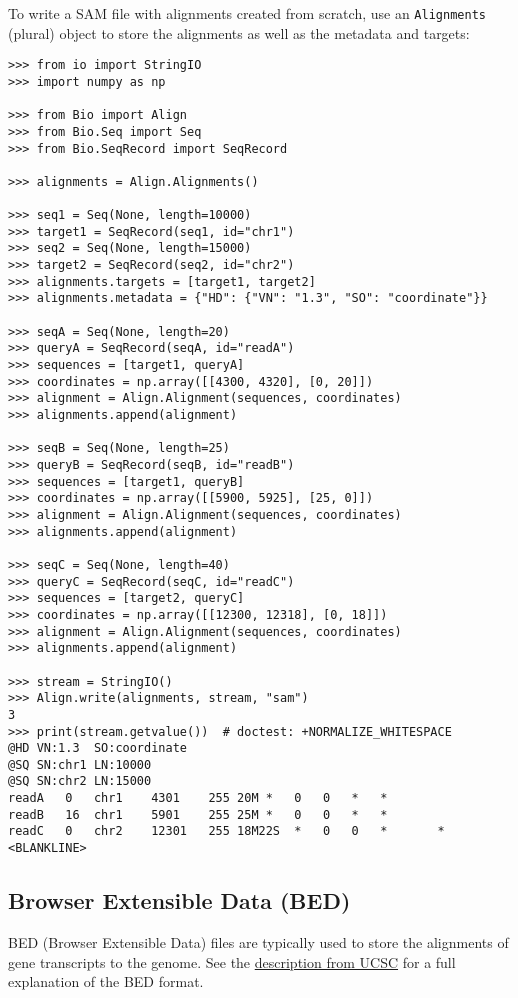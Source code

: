 To write a SAM file with alignments created from scratch, use an \verb|Alignments| (plural) object to store the alignments as well as the metadata and targets:
\begin{verbatim}
>>> from io import StringIO
>>> import numpy as np

>>> from Bio import Align
>>> from Bio.Seq import Seq
>>> from Bio.SeqRecord import SeqRecord

>>> alignments = Align.Alignments()

>>> seq1 = Seq(None, length=10000)
>>> target1 = SeqRecord(seq1, id="chr1")
>>> seq2 = Seq(None, length=15000)
>>> target2 = SeqRecord(seq2, id="chr2")
>>> alignments.targets = [target1, target2]
>>> alignments.metadata = {"HD": {"VN": "1.3", "SO": "coordinate"}}

>>> seqA = Seq(None, length=20)
>>> queryA = SeqRecord(seqA, id="readA")
>>> sequences = [target1, queryA]
>>> coordinates = np.array([[4300, 4320], [0, 20]])
>>> alignment = Align.Alignment(sequences, coordinates)
>>> alignments.append(alignment)

>>> seqB = Seq(None, length=25)
>>> queryB = SeqRecord(seqB, id="readB")
>>> sequences = [target1, queryB]
>>> coordinates = np.array([[5900, 5925], [25, 0]])
>>> alignment = Align.Alignment(sequences, coordinates)
>>> alignments.append(alignment)

>>> seqC = Seq(None, length=40)
>>> queryC = SeqRecord(seqC, id="readC")
>>> sequences = [target2, queryC]
>>> coordinates = np.array([[12300, 12318], [0, 18]])
>>> alignment = Align.Alignment(sequences, coordinates)
>>> alignments.append(alignment)

>>> stream = StringIO()
>>> Align.write(alignments, stream, "sam")
3
>>> print(stream.getvalue())  # doctest: +NORMALIZE_WHITESPACE
@HD	VN:1.3	SO:coordinate
@SQ	SN:chr1	LN:10000
@SQ	SN:chr2	LN:15000
readA	0	chr1	4301	255	20M	*	0	0	*	*
readB	16	chr1	5901	255	25M	*	0	0	*	*
readC	0	chr2	12301	255	18M22S	*	0	0	*       *
<BLANKLINE>
\end{verbatim}

\subsection{Browser Extensible Data (BED)}
\label{subsec:align_bed}

BED (Browser Extensible Data) files are typically used to store the alignments of gene transcripts to the genome. See the \href{http://genome.cse.ucsc.edu/FAQ/FAQformat.html#format1}{description from UCSC} for a full explanation of the BED format.

